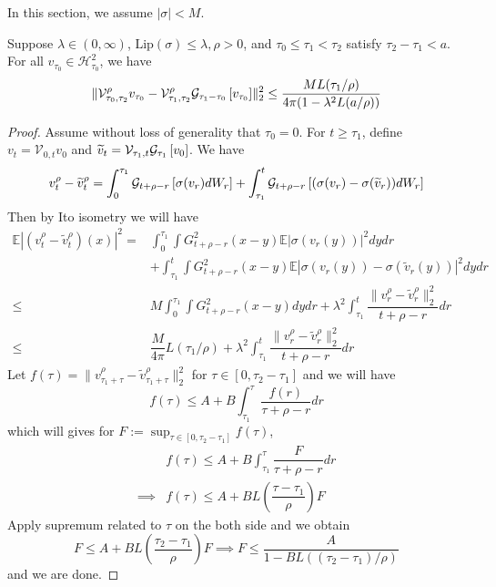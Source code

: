In this section, we assume $|\sigma| < M$.
\begin{proposition}
    Suppose $\lambda \in (0,\infty)$, $\text{Lip}(\sigma) \leq \lambda, \rho > 0$, and $\tau_0 \leq \tau_1 < \tau_2$ satisfy $\tau_2 - \tau_1 < a$. For all $v_{\tau_0} \in \mathscr{H}^{2}_{\tau_0}$, we have
    \[
    \lVert\mathcal{V}^{\rho}_{\tau_0,\tau_2} v_{\tau_0} - \mathcal{V}^{\rho}_{\tau_1,\tau_2}\mathcal{G}_{\tau_1-\tau_0}\left[{v_{\tau_0}}\right]\rVert_2^2 \leq \dfrac{ML(\tau_1/\rho)}{4\pi(1-\lambda^2L(a/\rho))}
    \]
\end{proposition}
\begin{proof}
    Assume without loss of generality that $\tau_0 = 0$. For $t\geq \tau_1$, define $v_t = \mathcal{V}_{0,t}v_0$ and $\widetilde{v}_t = \mathcal{V}_{\tau_1,t}\mathcal{G}_{\tau_1}\left[{v_0}\right]$. We have
    \[
    v_t^{\rho} - \widetilde{v}^{\rho}_t = \int_0^{\tau_1}\mathcal{G}_{t+\rho-r}\left[{\sigma(v_r)dW_r}\right] + \int_{\tau_1}^t \mathcal{G}_{t+\rho-r}\left[{(\sigma(v_r)-\sigma(\widetilde{v}_r))dW_r}\right]
    \]
    Then by Ito isometry we will have
    \[
    \begin{aligned}
        \mathbb{E}|(v_t^{\rho}-\widetilde{v}_t^{\rho})(x)|^2 = &\int_0^{\tau_1}\int  G^2_{t+\rho-r}(x-y)\mathbb{E}|\sigma(v_r(y))|^2dydr \\&+ \int_{\tau_1}^t\int  G^2_{t+\rho-r}(x-y)\mathbb{E}|\sigma(v_r(y)) - \sigma(\widetilde{v}_r(y))|^2dydr
        \\\leq& M\int_0^{\tau_1}\int  G^2_{t+\rho-r}(x-y)dydr + \lambda^2\int^t_{\tau_1} \dfrac{\lVert v_r^{\rho} - \widetilde{v}_r^{\rho}\rVert_2^2}{t+\rho-r}dr \\
        \leq &\dfrac{M}{4\pi} L(\tau_1/\rho) + \lambda^2 \int^t_{\tau_1} \dfrac{\lVert v_r^{\rho} - \widetilde{v}_r^{\rho}\rVert_2^2}{t+\rho-r}dr
    \end{aligned}
    \]
    Let $f (\tau) = \lVert v_{\tau_1+\tau}^{\rho} - \widetilde{v}_{\tau_1+\tau}^{\rho}\rVert_2^2$ for $\tau \in [0,\tau_2-\tau_1]$ and we will have
    \[
    f(\tau) \leq A + B\int^{\tau}_{\tau_1} \dfrac{f(r)}{\tau+\rho-r}dr
    \]
    which will gives for $F:=\sup_{\tau\in[0,\tau_2-\tau_1]} f(\tau)$,
    \[\begin{aligned}&f(\tau) \leq A + B \int_{\tau_1}^{\tau}\dfrac{F}{\tau+\rho-r}dr
    \\ \implies& f(\tau) \leq A + BL\left(\dfrac{\tau-\tau_1}{\rho}\right)F
    \end{aligned}
    \]
    Apply supremum related to $\tau$ on the both side and we obtain
    \[
    F \leq A + BL\left(\dfrac{\tau_2-\tau_1}{\rho}\right)F \implies F \leq \dfrac{A}{1-BL((\tau_2-\tau_1)/\rho)}
    \]
    and we are done.
\end{proof}

